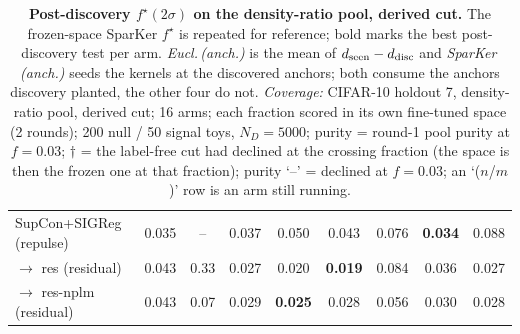 \begin{table}[t]
\begin{tabular}{lcccccccc}
\addlinespace
SupCon+SIGReg (repulse) & 0.035 & -- & 0.037 & 0.050 & 0.043 & 0.076 & \textbf{0.034} & 0.088 \\
\quad $\to$ res (residual) & 0.043 & 0.33 & 0.027 & 0.020 & \textbf{0.019} & 0.084 & 0.036 & 0.027 \\
\quad $\to$ res-nplm (residual) & 0.043 & 0.07 & 0.029 & \textbf{0.025} & 0.028 & 0.056 & 0.030 & 0.028 \\
\bottomrule
\end{tabular}
\caption{\textbf{Post-discovery $f^\star(2\sigma)$ on the density-ratio pool, derived cut.} The frozen-space SparKer $f^\star$ is repeated for reference; bold marks the best post-discovery test per arm. \emph{Eucl.\,(anch.)} is the mean of $d_{\rm seen}-d_{\rm disc}$ and \emph{SparKer\,(anch.)} seeds the kernels at the discovered anchors; both consume the anchors discovery planted, the other four do not. \emph{Coverage:} CIFAR-10 holdout 7, density-ratio pool, derived cut; 16 arms; each fraction scored in its own fine-tuned space (2 rounds); 200 null / 50 signal toys, $N_D{=}5000$; purity = round-1 pool purity at $f{=}0.03$; $\dagger$ = the label-free cut had declined at the crossing fraction (the space is then the frozen one at that fraction); purity `--' = declined at $f{=}0.03$; an `($n$/$m$)' row is an arm still running.}
\label{tab:sigma_post_cifar10_h7_np-legal}
\end{table}
